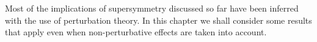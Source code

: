 
Most of the implications of supersymmetry discussed so far have been
inferred with the use of perturbation theory. In this chapter we shall
consider some results that apply even when non-perturbative effects are
taken into account.
